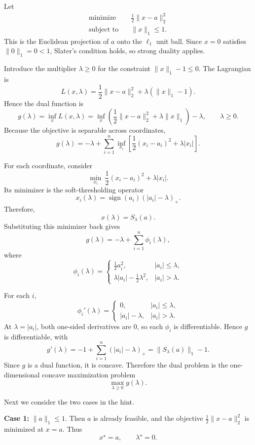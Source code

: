 \documentclass[11pt,letter,notitlepage]{article}
\theoremstyle{definition}
\begin{document}
\begin{solution}
\leavevmode\vspace{-2em}

Let
\[
\begin{aligned}
    \text{minimize} \quad & \frac{1}{2}\|x-a\|_2^2 \\
    \text{subject to} \quad & \|x\|_1 \le 1.
\end{aligned}
\]
This is the Euclidean projection of $a$ onto the $\ell_1$ unit ball.
Since $x=0$ satisfies $\|0\|_1=0<1$, Slater's condition holds, so strong duality applies.

Introduce the multiplier $\lambda\ge 0$ for the constraint $\|x\|_1-1\le 0$.
The Lagrangian is
\[
L(x,\lambda)=\frac12\|x-a\|_2^2+\lambda(\|x\|_1-1).
\]
Hence the dual function is
\[
g(\lambda)=\inf_x L(x,\lambda)
=\inf_x\left(\frac12\|x-a\|_2^2+\lambda\|x\|_1\right)-\lambda,
\qquad \lambda\ge 0.
\]
Because the objective is separable across coordinates,
\[
g(\lambda)
=-\lambda+\sum_{i=1}^n \inf_{x_i}
\left[\frac12(x_i-a_i)^2+\lambda |x_i|\right].
\]

For each coordinate, consider
\[
\min_{x_i}\ \frac12(x_i-a_i)^2+\lambda |x_i|.
\]
Its minimizer is the soft-thresholding operator
\[
x_i(\lambda)=\operatorname{sign}(a_i)(|a_i|-\lambda)_+.
\]
Therefore,
\[
x(\lambda)=S_\lambda(a).
\]
Substituting this minimizer back gives
\[
g(\lambda)=-\lambda+\sum_{i=1}^n \phi_i(\lambda),
\]
where
\[
\phi_i(\lambda)=
\begin{cases}
\frac12 a_i^2, & |a_i|\le \lambda,\\[1mm]
\lambda |a_i|-\frac12\lambda^2, & |a_i|>\lambda.
\end{cases}
\]

For each $i$,
\[
\phi_i'(\lambda)=
\begin{cases}
0, & |a_i|\le \lambda,\\[1mm]
|a_i|-\lambda, & |a_i|>\lambda.
\end{cases}
\]
At $\lambda=|a_i|$, both one-sided derivatives are $0$, so each $\phi_i$ is differentiable. Hence $g$ is differentiable, with
\[
g'(\lambda)
=-1+\sum_{i=1}^n (|a_i|-\lambda)_+
=\|S_\lambda(a)\|_1-1.
\]
Since $g$ is a dual function, it is concave. Therefore the dual problem is the one-dimensional concave maximization problem
\[
\max_{\lambda\ge 0} g(\lambda).
\]

Next we consider the two cases in the hint.

\textbf{Case 1:} $\|a\|_1\le 1$.
Then $a$ is already feasible, and the objective $\frac12\|x-a\|_2^2$ is minimized at $x=a$. Thus
\[
x^\star=a,
\qquad
\lambda^\star=0.
\]


\end{solution}
\end{document}
